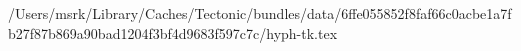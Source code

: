 /Users/msrk/Library/Caches/Tectonic/bundles/data/6ffe055852f8faf66c0acbe1a7fb27f87b869a90bad1204f3bf4d9683f597c7c/hyph-tk.tex